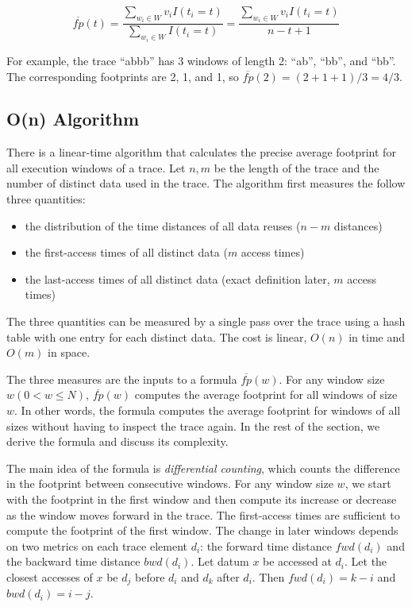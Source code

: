 $$\overline{fp}(t) = \frac{\sum_{w_i \in W} v_i I( t_i = t
  )}{\sum_{w_i \in W} I(t_i = t)} = \frac{\sum_{w_i \in W} v_i I( t_i = t
  )}{ n - t + 1} $$


For example, the trace ``abbb'' has 3 windows of length 2: ``ab'',
``bb'', and ``bb''.  The corresponding footprints are 2, 1, and 1, so
$\overline{fp}(2) = (2+1+1)/3 = 4/3$.  

\subsection{O(n) Algorithm}

There is a linear-time algorithm that calculates the precise average
footprint for all execution windows of a trace.  Let $n,m$ be the
length of the trace and the number of distinct data used in the trace.  The
algorithm first measures the follow three quantities: 

\begin{itemize}
  \item the distribution of the time distances of all data reuses ($n-m$ distances)
  \item the first-access times of all distinct data ($m$
  access times)
\item the last-access times of all distinct data (exact definition
  later, $m$
  access times)
\end{itemize}

The three quantities can be measured by a single pass over the
trace using a hash table with one entry for each distinct
data.  The cost is linear, $O(n)$ in time and $O(m)$ in space.

The three measures are the inputs to a formula $\overline{fp}(w)$.
For any window size $w (0< w \le N)$, $\overline{fp}(w)$ computes the average
footprint for all windows of size $w$.  In other words, the formula computes
the average footprint for windows of all sizes without having to
inspect the trace
again.  In the rest of the section, we derive the formula and discuss
its complexity.

The main idea of the formula is \emph{differential counting}, which
counts the difference in the footprint between consecutive windows.  For
any window size $w$, we start with the footprint in the first window
and then compute its increase or decrease as the window moves forward
in the trace.  The first-access times are sufficient to compute the
footprint of the first window.  The change in later windows depends on two metrics on
each trace element $d_i$: the forward time distance $fwd(d_i)$
and the backward time distance $bwd(d_i)$.  Let datum $x$ be accessed
at $d_i$.  Let the closest accesses of $x$ be
$d_j$ before $d_i$ and $d_k$ after $d_i$.  Then $fwd(d_i) = k - i$ and
$bwd(d_i) = i - j$.

